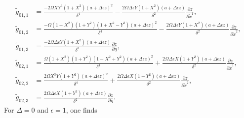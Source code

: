 \documentclass{article}
\begin{document}
\begin{align}
\tilde{g}_{01,1}&=\frac{-2\Omega XY^3(1+X^2)(a+\Delta \epsilon z)^2}{\delta^4} - \frac{2\Omega \Delta \epsilon Y(1+X^2)(a+\Delta \epsilon z)}{\delta^2} \frac{\partial z}{\partial \tilde{x}^1}, \\
\tilde{g}_{01,2}&=\frac{-\Omega (1+X^2)(1+Y^2)(1+X^2-Y^2)(a+\Delta \epsilon z)^2}{\delta^4} - \frac{2\Omega \Delta \epsilon Y(1+X^2)(a+\Delta \epsilon z)}{\delta^2} \frac{\partial z}{\partial \tilde{x}^2}, \\
\tilde{g}_{01,3}&=\frac{-2\Omega \Delta \epsilon Y(1+X^2)(a+\Delta \epsilon z)}{\delta^2} \frac{\partial z}{\partial \eta}, \\
\tilde{g}_{02,1}&=\frac{\Omega (1+X^2)(1+Y^2)(1-X^2+Y^2)(a+\Delta \epsilon z)^2}{\delta^4} + \frac{2\Omega \Delta \epsilon X(1+Y^2)(a+\Delta \epsilon z)}{\delta^2} \frac{\partial z}{\partial \tilde{x}^1}, \\
\tilde{g}_{02,2}&=\frac{2\Omega X^3Y(1+Y^2)(a+\Delta \epsilon z)^2}{\delta^4} + \frac{2\Omega \Delta \epsilon X(1+Y^2)(a+\Delta \epsilon z)}{\delta^2} \frac{\partial z}{\partial \tilde{x}^2}, \\
\tilde{g}_{02,3}&=\frac{2\Omega \Delta \epsilon X(1+Y^2)(a+\Delta \epsilon z)}{\delta^2} \frac{\partial z}{\partial \eta}.
\end{align}
For $\Delta=0$ and $\epsilon=1$, one finds
\end{document}

